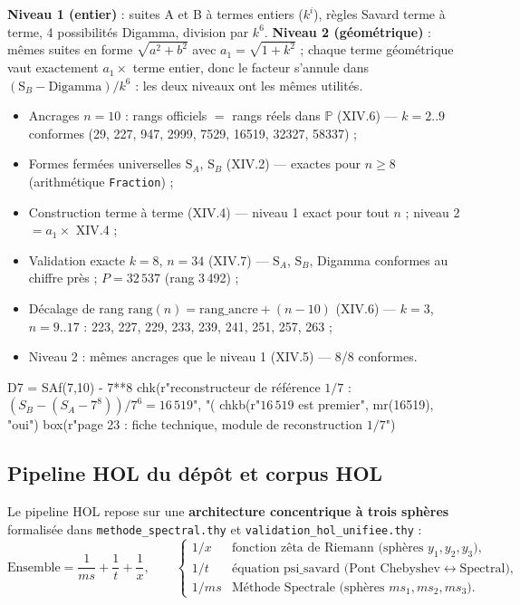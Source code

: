 \documentclass[11pt,a4paper]{article}
\newcommand{\SA}{\mathrm{S}_A}
\newcommand{\SB}{\mathrm{S}_B}
\begin{document}
\textbf{Niveau 1 (entier)} : suites A et B à termes entiers ($k^{i}$), règles
Savard terme à terme, 4 possibilités Digamma, division par $k^{6}$.
\textbf{Niveau 2 (géométrique)} : mêmes suites en forme $\sqrt{a^{2}+b^{2}}$
avec $a_1 = \sqrt{1+k^{2}}$ ; chaque terme géométrique vaut exactement
$a_1 \times$ terme entier, donc le facteur s'annule dans
$(\SB - \text{Digamma})/k^{6}$ : les deux niveaux ont les mêmes utilités.

\vspace{0.3cm}
\begin{boiteformule}
\begin{itemize}[nosep]
  \item Ancrages $n=10$ : rangs officiels $=$ rangs réels dans $\mathbb{P}$ (XIV.6) --- $k=2..9$ conformes (29, 227, 947, 2999, 7529, 16519, 32327, 58337) ;
  \item Formes fermées universelles $\SA$, $\SB$ (XIV.2) --- exactes pour $n \ge 8$ (arithmétique \texttt{Fraction}) ;
  \item Construction terme à terme (XIV.4) --- niveau 1 exact pour tout $n$ ; niveau 2 $= a_1 \times$ XIV.4 ;
  \item Validation exacte $k=8$, $n=34$ (XIV.7) --- $\SA$, $\SB$, Digamma conformes au chiffre près ; $P = 32\,537$ (rang 3\,492) ;
  \item Décalage de rang $\text{rang}(n) = \text{rang\_ancre} + (n-10)$ (XIV.6) --- $k=3$, $n=9..17$ : 223, 227, 229, 233, 239, 241, 251, 257, 263 ;
  \item Niveau 2 : mêmes ancrages que le niveau 1 (XIV.5) --- 8/8 conformes.
\end{itemize}
\end{boiteformule}

\begin{pycode}
D7 = SAf(7,10) - 7**8
chk(r"reconstructeur de référence $1/7$ : $(S_B-(S_A-7^8))/7^6=16\,519$", "(%
chkb(r"$16\,519$ est premier", mr(16519), "oui")
box(r"page 23 : fiche technique, module de reconstruction $1/7$")
\end{pycode}

\subsection{Pipeline HOL du dépôt et corpus HOL}

Le pipeline HOL repose sur une \textbf{architecture concentrique à trois
sphères} formalisée dans \texttt{methode\_spectral.thy} et
\texttt{validation\_hol\_unifiee.thy} :
\[
\text{Ensemble} = \frac{1}{ms} + \frac{1}{t} + \frac{1}{x},
\qquad
\begin{cases}
1/x & \text{fonction zêta de Riemann (sphères } y_1, y_2, y_3\text{)},\\
1/t & \text{équation psi\_savard (Pont Chebyshev} \leftrightarrow \text{Spectral)},\\
1/ms & \text{Méthode Spectrale (sphères } ms_1, ms_2, ms_3\text{)}.
\end{cases}
\]
\end{document}
